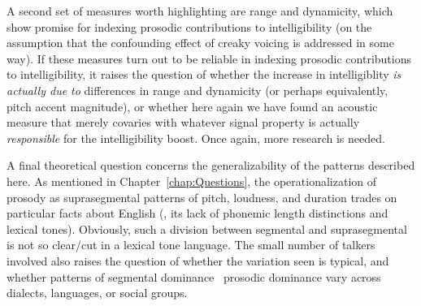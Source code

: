 A second set of measures worth highlighting are \fo{} range and \fo{} dynamicity, which show promise for indexing prosodic contributions to intelligibility (on the assumption that the confounding effect of creaky voicing is addressed in some way).  If these measures turn out to be reliable in indexing prosodic contributions to intelligibility, it raises the question of whether the increase in intelligiblity \emph{is actually due to} differences in \fo{} range and dynamicity (or perhaps equivalently, pitch accent magnitude), or whether here again we have found an acoustic measure that merely covaries with whatever signal property is actually \emph{responsible} for the intelligibility boost.  Once again, more research is needed.

A final theoretical question concerns the generalizability of the patterns described here.  As mentioned in Chapter~\ref{chap:Questions}, the operationalization of prosody as suprasegmental patterns of pitch, loudness, and duration trades on particular facts about English (\ie, its lack of phonemic length distinctions and lexical tones).  Obviously, such a division between segmental and suprasegmental is not so clear\-/cut in a lexical tone language.  The small number of talkers involved also raises the question of whether the variation seen is typical, and whether patterns of segmental dominance \vs\ prosodic dominance vary across dialects, languages, or social groups.


